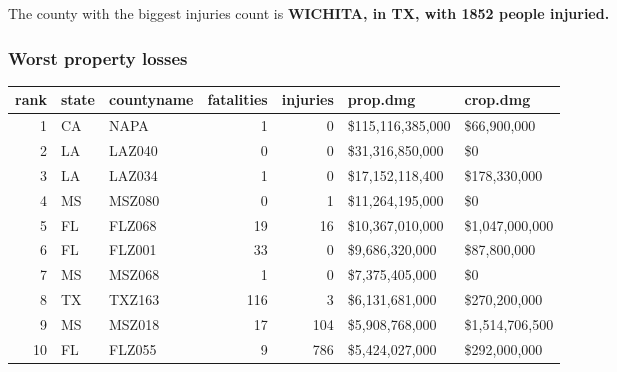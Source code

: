 \documentclass[]{article}
\newenvironment{Shaded}{\begin{snugshade}}{\end{snugshade}}
\newcommand{\KeywordTok}[1]{\textcolor[rgb]{0.13,0.29,0.53}{\textbf{{#1}}}}
\newcommand{\DataTypeTok}[1]{\textcolor[rgb]{0.13,0.29,0.53}{{#1}}}
\newcommand{\DecValTok}[1]{\textcolor[rgb]{0.00,0.00,0.81}{{#1}}}
\newcommand{\StringTok}[1]{\textcolor[rgb]{0.31,0.60,0.02}{{#1}}}
\newcommand{\CommentTok}[1]{\textcolor[rgb]{0.56,0.35,0.01}{\textit{{#1}}}}
\newcommand{\NormalTok}[1]{{#1}}
\begin{document}
The county with the biggest injuries count is \textbf{WICHITA, in TX,
with 1852 people injuried.}

\subsubsection{Worst property losses}\label{worst-property-losses}

\begin{Shaded}
\end{Shaded}

\begin{longtable}[]{@{}rllrrll@{}}
\toprule
rank & state & countyname & fatalities & injuries & prop.dmg &
crop.dmg\tabularnewline
\midrule
\endhead
1 & CA & NAPA & 1 & 0 & \$115,116,385,000 & \$66,900,000\tabularnewline
2 & LA & LAZ040 & 0 & 0 & \$31,316,850,000 & \$0\tabularnewline
3 & LA & LAZ034 & 1 & 0 & \$17,152,118,400 &
\$178,330,000\tabularnewline
4 & MS & MSZ080 & 0 & 1 & \$11,264,195,000 & \$0\tabularnewline
5 & FL & FLZ068 & 19 & 16 & \$10,367,010,000 &
\$1,047,000,000\tabularnewline
6 & FL & FLZ001 & 33 & 0 & \$9,686,320,000 & \$87,800,000\tabularnewline
7 & MS & MSZ068 & 1 & 0 & \$7,375,405,000 & \$0\tabularnewline
8 & TX & TXZ163 & 116 & 3 & \$6,131,681,000 &
\$270,200,000\tabularnewline
9 & MS & MSZ018 & 17 & 104 & \$5,908,768,000 &
\$1,514,706,500\tabularnewline
10 & FL & FLZ055 & 9 & 786 & \$5,424,027,000 &
\$292,000,000\tabularnewline
\bottomrule
\end{longtable}

\begin{Shaded}
\end{Shaded}
\end{document}
